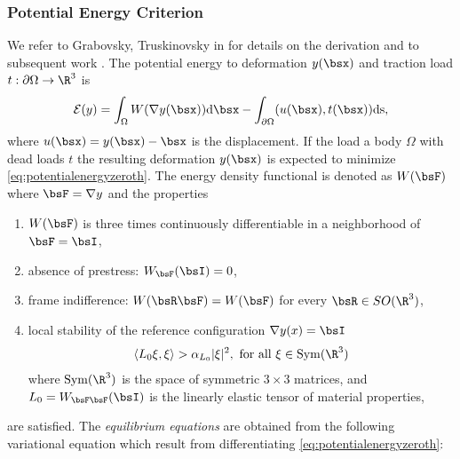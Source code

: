 \subsubsection{Potential Energy Criterion}
We refer to Grabovsky, Truskinovsky in \cite{Grabovsky2007TheFS} for details on the derivation and to subsequent work \cite{grabovsky2013rigorousasymptoticanalysisbuckling}.
The potential energy to deformation $y(\bsx)$ and traction load $t : \partial \Omega \to \R^3$ is
\begin{align}\label{eq:potentialenergyzeroth}
    \mathcal{E}(y) = \int_{\Omega} W(\nabla y(\bsx)) \mathrm{d\bsx} - \int_{\partial \Omega} (u(\bsx),t(\bsx)) \mathrm{ds},
\end{align}
where $ u(\bsx) = y(\bsx) - \bsx$ is the displacement.
If the load a body $\Omega$ with dead loads $t$ the resulting deformation $y(\bsx) $ is expected to minimize \eqref{eq:potentialenergyzeroth}.
The energy density functional is denoted  as $W(\bsF)$ where $\bsF = \nabla y$ and the properties 
\begin{enumerate}
    \item[(P1)] $W(\bsF)$ is three times continuously differentiable in a neighborhood of $\bsF = \bsI$,
    \item[(P2)] absence of prestress: $W_{\bsF} (\bsI) = 0$,
    \item[(P3)] frame indifference: $W(\bsR \bsF) = W(\bsF)$ for every $\bsR \in \mathop{SO}(\R^3)$,
    \item[(P4)] local stability of the reference configuration  $\nabla y(x) = \bsI$
    \begin{align*}
        \left \langle L_0 \xi, \xi \right \rangle > \alpha_{L_0} \vert \xi \vert^2, \text{ for all }\xi \in \mathrm{Sym}(\R^3)
    \end{align*}
    where $\mathrm{Sym}(\R^3)$ is the space of symmetric $3 \times 3$ matrices, and $L_0 = W_{\bsF \bsF} (\bsI)$ is the linearly elastic tensor of material properties,
\end{enumerate}
are satisfied.
The  \emph{equilibrium equations} are obtained from the following variational equation which result from differentiating \eqref{eq:potentialenergyzeroth}:

